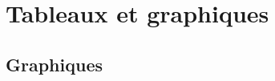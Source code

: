 \documentclass[
  10pt,
  a4paper,
  numbers=noendperiod,
  DIV=9]{scrreprt}
\begin{document}

\hypertarget{tableaux-et-graphiques}{%
\chapter{Tableaux et graphiques}\label{tableaux-et-graphiques}}

\listoftables

\hypertarget{graphiques}{%
\section*{Graphiques}\label{graphiques}}


\listoffigures
\end{document}
